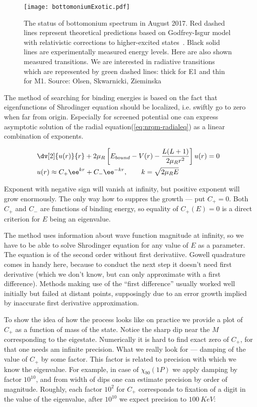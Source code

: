 \begin{figure}[H]
    \centering
    \texttt{[image: bottomoniumExotic.pdf]}
    \caption{The status of bottomonium spectrum in August 2017. Red dashed lines represent theoretical predictions based on Godfrey-Isgur model with relativistic corrections to higher-excited states~\cite{gbs-model}. Black solid lines are experimentally measured energy levels. Here are also shown measured transitions. We are interested in radiative transitions which are represented by green dashed lines: thick for E1 and thin for M1. Source: Olsen, Skwarnicki, Zieminska~\cite{heavy-quark_pics}} \label{fig:bot-states}
\end{figure}

The method of searching for binding energies is based on the fact that eigenfunctions of Shrodinger equation should be localized, i.e. swiftly go to zero when far from origin. Especially for screened potential one can express asymptotic solution of  the radial equation(\cref{eq:nrqm-radialeq}) as a linear combination of exponents.

\begin{align}
    &\dv[2]{u(r)}{r} + 2 \mu_R \left[ E_{bound} - V(r) - \frac{L(L+1)}{2 \mu_R r^2} \right] u(r) = 0 \\
    &u(r) \approx C_+ \ee^{k r} + C_- \ee^{-k r},\qquad k = \sqrt{2 \mu_R E}
\end{align}

Exponent with negative sign will vanish at infinity, but positive exponent will grow enormously. The only way how to suppres the growth --- put $C_+ = 0$. Both $C_+$ and $C_-$ are functions of binding energy, so equality of $C_+(E) = 0$ is a direct criterion for $E$ being an eigenvalue.

The method uses information about wave function magnitude at infinity, so we have to be able to solve Shrodinger equation for any value of $E$ as a parameter. The equation is of the second order without first derivatiive. Gowell quadrature~\cite{deng-bot} comes in handy here, because to conduct the next step it doesn't need first derivative (which we don't know, but can only approximate with a first difference). Methods making use of the ``first difference'' usually worked well initially but failed at distant points, supposingly due to an error growth implied by inaccurate first derivative approximation. 

To show the idea of how the process looks like on practice we provide a plot of $C_+$ as a function of mass of the state. Notice the sharp dip near the $M$ corresponding to the eigestate. Numerically it is hard to find exact zero of $C_+$, for that one needs am infinite precision. What we really look for --- damping of the value of $C_+$ by some factor. This factor is related to precision with which we know the eigenvalue. For example, in case of $\chi_{b0}(1P)$ we apply damping by factor $10^{10}$, and from width of dips one can estimate precision by order of magnitude. Roughly, each factor $10^{2}$ for $C_+$ corresponds to fixation of a digit in the value of the eigenvalue, after $10^{10}$ we expect precision to $100~KeV$:

